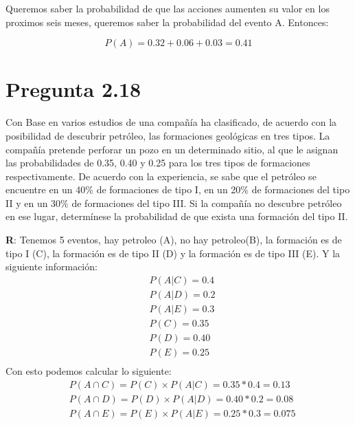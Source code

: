 \documentclass{article}
\newcommand{\prob}[1]{{P} \left( {#1} \right)}
\begin{document}
\vspace{0.2cm}
Queremos saber la probabilidad de que las acciones aumenten su valor en los proximos seis meses, queremos saber la probabilidad
del evento A. Entonces:

\begin{equation*}
	\prob{A} = 0.32 + 0.06 + 0.03 = 0.41
\end{equation*}


\newpage
\section*{Pregunta 2.18}
Con Base en varios estudios de una compañía ha clasificado, de acuerdo con la posibilidad de descubrir petróleo,
las formaciones geológicas en tres tipos. La compañía pretende perforar un pozo en un determinado sitio, al que le asignan
las probabilidades de 0.35, 0.40 y 0.25 para los tres tipos de formaciones respectivamente.
De acuerdo con la experiencia, se sabe que el petróleo se encuentre en un 40\% de formaciones de tipo I,
en un 20\% de formaciones del tipo II y en un 30\% de formaciones del tipo III. Si la compañía no descubre petróleo en ese lugar,
determínese la probabilidad de que exista una formación del tipo II.

\vspace{0.4cm}

\textbf{R}: Tenemos 5 eventos, hay petroleo (A), no hay petroleo(B), la formación es de tipo I (C), la formación es de tipo II (D)
y la formación es de tipo III (E). Y la siguiente información:
\begin{align*}
& \prob{A | C} = 0.4 \\
& \prob{A | D} = 0.2 \\
& \prob{A | E} = 0.3 \\
& \prob{C} = 0.35 \\
& \prob{D} = 0.40 \\
& \prob{E} = 0.25 \\
\end{align*}
Con esto podemos calcular lo siguiente: 
\begin{align*}
& \prob{A \cap C} = \prob{C} \times \prob{A | C} = 0.35 * 0.4 = 0.13 \\
& \prob{A \cap D} = \prob{D} \times \prob{A | D} = 0.40 * 0.2 = 0.08 \\
& \prob{A \cap E} = \prob{E} \times \prob{A | E} = 0.25 * 0.3 = 0.075 \\
\end{align*}
\end{document}
